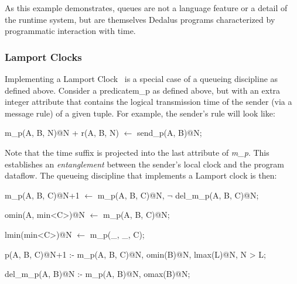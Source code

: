 As this example demonstrates, queues are not a language feature or a detail of the runtime system, but are themselves Dedalus programs
characterized by programmatic interaction with time.




\subsubsection{Lamport Clocks}

Implementing a Lamport Clock~\cite{timeclocks} is a special case of a queueing discipline as defined above.
Consider a predicate{m\_p} as defined above, but with an extra integer attribute that contains the logical transmission
time of the sender (via a message rule) of a given tuple.  For example, the sender's rule will look like: 

\begin{Dedalus}
m\_p(A, B, N)@N + r(A, B, N) \(\leftarrow\)
  send\_p(A, B)@N;
\end{Dedalus}

Note that the time suffix is projected into the last attribute of \emph{m\_p}.  This establishes an \emph{entanglement} between
the sender's local clock and the program dataflow.  The queueing discipline that implements a
Lamport clock is then:

\begin{Dedalus}

m\_p(A, B, C)@N+1 \(\leftarrow\)
  m\_p(A, B, C)@N,
  \(\lnot\) del\_m\_p(A, B, C)@N;

omin(A, min<C>)@N \(\leftarrow\)
  m\_p(A, B, C)@N;

lmin(min<C>)@N \(\leftarrow\)
  m\_p(_, _, C);

p(A, B, C)@N+1 :-
  m\_p(A, B, C)@N,
  omin(B)@N,
  lmax(L)@N,
  N > L;

del\_m\_p(A, B)@N :-
  m\_p(A, B)@N,
  omax(B)@N;
  
\end{Dedalus}


